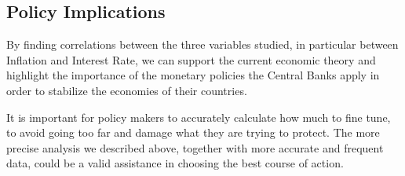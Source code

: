 \subsection*{Policy Implications}
By finding correlations between the three variables studied, in particular between Inflation and Interest Rate, we can support the current economic theory and highlight the importance of the monetary policies the Central Banks apply in order to stabilize the economies of their countries.

It is important for policy makers to accurately calculate how much to fine tune, to avoid going too far and damage what they are trying to protect. The more precise analysis we described above, together with more accurate and frequent data, could be a valid assistance in choosing the best course of action.
